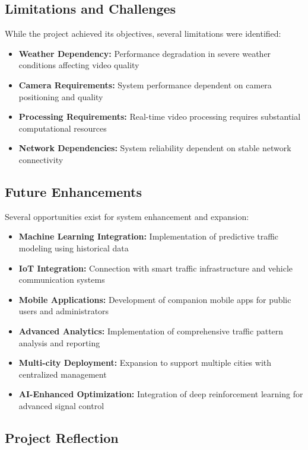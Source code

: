\documentclass[conference]{IEEEtran}
\begin{document}
\subsection{Limitations and Challenges}

While the project achieved its objectives, several limitations were identified:

\begin{itemize}
\item \textbf{Weather Dependency:} Performance degradation in severe weather conditions affecting video quality
\item \textbf{Camera Requirements:} System performance dependent on camera positioning and quality
\item \textbf{Processing Requirements:} Real-time video processing requires substantial computational resources
\item \textbf{Network Dependencies:} System reliability dependent on stable network connectivity
\end{itemize}

\subsection{Future Enhancements}

Several opportunities exist for system enhancement and expansion:

\begin{itemize}
\item \textbf{Machine Learning Integration:} Implementation of predictive traffic modeling using historical data
\item \textbf{IoT Integration:} Connection with smart traffic infrastructure and vehicle communication systems
\item \textbf{Mobile Applications:} Development of companion mobile apps for public users and administrators
\item \textbf{Advanced Analytics:} Implementation of comprehensive traffic pattern analysis and reporting
\item \textbf{Multi-city Deployment:} Expansion to support multiple cities with centralized management
\item \textbf{AI-Enhanced Optimization:} Integration of deep reinforcement learning for advanced signal control
\end{itemize}

\subsection{Project Reflection}
\end{document}
